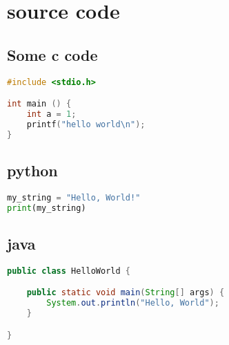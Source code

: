 


\section{source code}
\label{sec:orge9b635d}

\subsection{Some c code}
\label{sec:org16a80b2}
\begin{lstlisting}[language=C, caption=C example]
#include <stdio.h>

int main () {
    int a = 1;
    printf("hello world\n");
}
\end{lstlisting}

\subsection{python}
\label{sec:org374ecca}
\begin{lstlisting}[language=Python, caption=Python example]
my_string = "Hello, World!"
print(my_string)
\end{lstlisting}

\subsection{java}
\label{sec:org1c88c9a}
\begin{lstlisting}[language=Java, caption=Java example]
public class HelloWorld {

    public static void main(String[] args) {
        System.out.println("Hello, World");
    }

}
\end{lstlisting}


